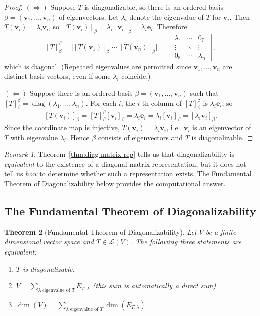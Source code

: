 \documentclass[11pt, a4paper, notitlepage]{report}
\newtheorem{theorem}{Theorem}[section]
\theoremstyle{definition}
\theoremstyle{remark}
\newtheorem{remark}[theorem]{Remark}
\begin{document}
\begin{proof}
$(\Rightarrow)$ Suppose $T$ is diagonalizable, so there is an ordered basis
$\beta = (\mathbf{v}_1, \ldots, \mathbf{v}_n)$ of eigenvectors. Let $\lambda_i$ denote the
eigenvalue of $T$ for $\mathbf{v}_i$. Then $T(\mathbf{v}_i) = \lambda_i \mathbf{v}_i$, so
$[T(\mathbf{v}_i)]_\beta = \lambda_i [\mathbf{v}_i]_\beta = \lambda_i \mathbf{e}_i$.
Therefore
\[
  [T]_\beta^\beta
  = \bigl[[T(\mathbf{v}_1)]_\beta \;\cdots\; [T(\mathbf{v}_n)]_\beta\bigr]
  = \begin{bmatrix} \lambda_1 & \cdots & 0_\mathbb{F} \\ \vdots & \ddots & \vdots \\
    0_\mathbb{F} & \cdots & \lambda_n \end{bmatrix},
\]
which is diagonal. (Repeated eigenvalues are permitted since $\mathbf{v}_1,\ldots,\mathbf{v}_n$
are distinct basis vectors, even if some $\lambda_i$ coincide.)

$(\Leftarrow)$ Suppose there is an ordered basis $\beta = (\mathbf{v}_1, \ldots, \mathbf{v}_n)$
such that $[T]_\beta^\beta = \operatorname{diag}(\lambda_1, \ldots, \lambda_n)$.
For each $i$, the $i$-th column of $[T]_\beta^\beta$ is $\lambda_i \mathbf{e}_i$, so
\[
  [T(\mathbf{v}_i)]_\beta = [T]_\beta^\beta [\mathbf{v}_i]_\beta
  = \lambda_i \mathbf{e}_i = \lambda_i [\mathbf{v}_i]_\beta = [\lambda_i \mathbf{v}_i]_\beta.
\]
Since the coordinate map is injective, $T(\mathbf{v}_i) = \lambda_i \mathbf{v}_i$, i.e.\
$\mathbf{v}_i$ is an eigenvector of $T$ with eigenvalue $\lambda_i$. Hence $\beta$ consists of
eigenvectors and $T$ is diagonalizable.
\end{proof}

\begin{remark}
Theorem~\ref{thm:diag-matrix-rep} tells us that diagonalizability is \emph{equivalent} to the
existence of a diagonal matrix representation, but it does not tell us \emph{how} to determine
whether such a representation exists. The Fundamental Theorem of Diagonalizability below
provides the computational answer.
\end{remark}

\subsection{The Fundamental Theorem of Diagonalizability}

\begin{theorem}[Fundamental Theorem of Diagonalizability]
\label{thm:fund-diag}
Let $V$ be a finite-dimensional vector space and $T \in \mathcal{L}(V)$.
The following three statements are equivalent:
\begin{enumerate}
  \item $T$ is diagonalizable.
  \item $V = \displaystyle\sum_{\lambda\;\text{eigenvalue of }T} E_{T,\lambda}$
        \quad (this sum is automatically a direct sum).
  \item $\dim(V) = \displaystyle\sum_{\lambda\;\text{eigenvalue of }T} \dim(E_{T,\lambda})$.
\end{enumerate}
\end{theorem}
\end{document}
